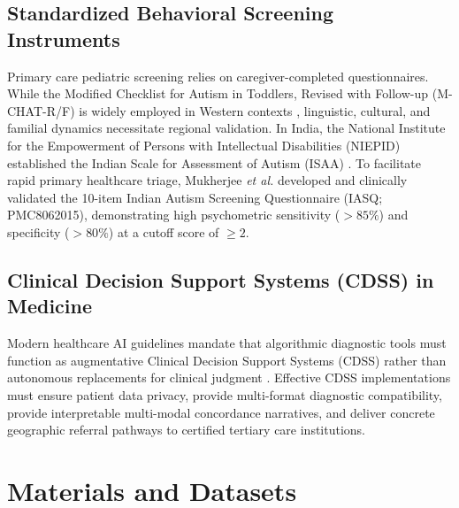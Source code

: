 \documentclass[conference]{IEEEtran}
\begin{document}
\subsection{Standardized Behavioral Screening Instruments}
Primary care pediatric screening relies on caregiver-completed questionnaires. While the Modified Checklist for Autism in Toddlers, Revised with Follow-up (M-CHAT-R/F) is widely employed in Western contexts \cite{robins2014validation}, linguistic, cultural, and familial dynamics necessitate regional validation. In India, the National Institute for the Empowerment of Persons with Intellectual Disabilities (NIEPID) established the Indian Scale for Assessment of Autism (ISAA) \cite{nimh2009isaa}. To facilitate rapid primary healthcare triage, Mukherjee \emph{et al.} \cite{mukherjee2021indian} developed and clinically validated the 10-item Indian Autism Screening Questionnaire (IASQ; PMC8062015), demonstrating high psychometric sensitivity ($>85\%$) and specificity ($>80\%$) at a cutoff score of $\ge 2$.

\subsection{Clinical Decision Support Systems (CDSS) in Medicine}
Modern healthcare AI guidelines mandate that algorithmic diagnostic tools must function as augmentative Clinical Decision Support Systems (CDSS) rather than autonomous replacements for clinical judgment \cite{topol2019high}. Effective CDSS implementations must ensure patient data privacy, provide multi-format diagnostic compatibility, provide interpretable multi-modal concordance narratives, and deliver concrete geographic referral pathways to certified tertiary care institutions.

\section{Materials and Datasets}
\end{document}
